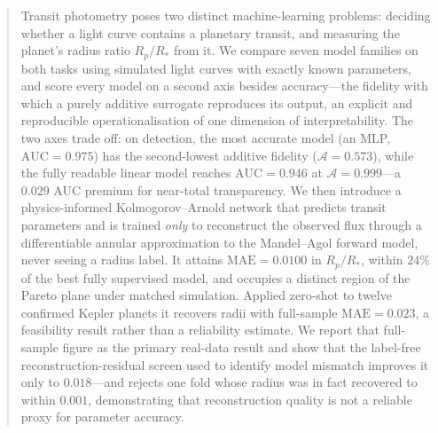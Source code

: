 \documentclass[manuscript,nonacm]{acmart}
\begin{document}
\begin{abstract}
Transit photometry poses two distinct machine-learning problems: deciding whether a
light curve contains a planetary transit, and measuring the planet's radius ratio
$R_p/R_*$ from it. We compare seven model families on both tasks using simulated light
curves with exactly known parameters, and score every model on a second axis besides
accuracy---the fidelity with which a purely additive surrogate reproduces its output,
an explicit and reproducible operationalisation of one dimension of interpretability.
The two axes trade off: on detection, the most accurate model (an MLP,
$\mathrm{AUC}=0.975$) has the second-lowest additive fidelity ($\mathcal{A}=0.573$),
while the fully readable linear model reaches $\mathrm{AUC}=0.946$ at
$\mathcal{A}=0.999$---a $0.029$ AUC premium for near-total transparency. We then
introduce a physics-informed Kolmogorov--Arnold network that predicts transit parameters
and is trained \emph{only} to reconstruct the observed flux through a differentiable
annular approximation to the Mandel--Agol forward model, never seeing a radius label. It attains
$\mathrm{MAE}=0.0100$ in $R_p/R_*$, within $24\%$ of the best fully supervised model,
and occupies a distinct region of the Pareto plane under matched simulation. Applied
zero-shot to twelve confirmed Kepler planets it recovers radii with full-sample
$\mathrm{MAE}=0.023$, a feasibility result rather than a reliability estimate. We
report that full-sample figure as the primary real-data result and show that the
label-free reconstruction-residual screen used to identify model mismatch improves it
only to $0.018$---and rejects one fold whose radius was in fact recovered to within
$0.001$, demonstrating that reconstruction quality is not a reliable proxy for parameter
accuracy.
\end{abstract}



\maketitle

\end{document}
